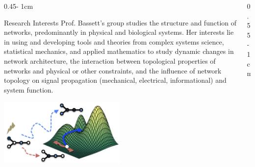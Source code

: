 \documentclass{../psuposter}
\begin{document}
\begin{frame}
\begin{columns}[t, totalwidth=\textwidth]
\begin{column}{0.45\textwidth - 1cm}
    \begin{block}{Research Interests}
        Prof. Bassett’s group studies the structure and function of networks, predominantly in physical and biological systems. Her interests lie in using and developing tools and theories from complex systems science, statistical mechanics, and applied mathematics to study dynamic changes in network architecture, the interaction between topological properties of networks and physical or other constraints, and the influence of network topology on signal propagation (mechanical, electrical, informational) and system function. \cite{bassettComplexSystemsLab}
        
        \begin{center}
	    	\includegraphics[width=0.5\textwidth]{images/research}    		
    	\end{center}
    \end{block}
\end{column}
\begin{column}{0.55\textwidth - 1cm}



\end{column}
\end{columns}
\end{frame}
\end{document}
